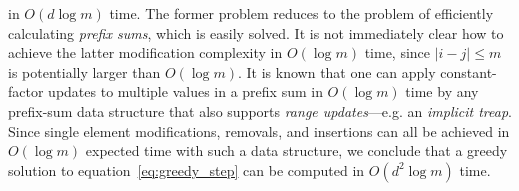 \documentclass{article} %
\begin{document}
in $O(d\log m)$ time. 
The former problem reduces to the problem of efficiently calculating \emph{prefix sums}, which is easily solved. 
It is not immediately clear how to achieve the latter modification complexity in $O(\log m)$ time, since $\lvert i - j \rvert \leq m$ is potentially larger than $O(\log m)$.  
It is known that one can apply constant-factor updates to multiple values in a prefix sum in $O(\log m)$ time by any prefix-sum data structure that also supports \emph{range updates}---e.g. an \emph{implicit treap}. 
Since single element modifications, removals, and insertions can all be achieved in $O(\log m)$ expected time with such a data structure, we conclude that a greedy solution to equation~\ref{eq:greedy_step} can be computed in $O(d^2 \log m)$ time. 

\end{document}
